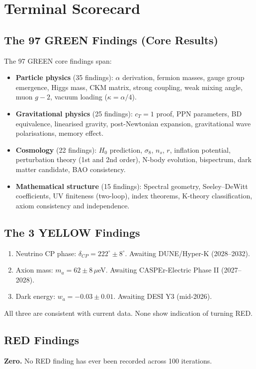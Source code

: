 \documentclass[11pt,a4paper]{article}
\begin{document}
\section{Terminal Scorecard}

\begin{tcolorbox}[colback=green!5!white, colframe=dfdgreen, title=\textbf{SCORECARD: 97 GREEN / 3 YELLOW / 0 RED}]

\subsection*{The 97 GREEN Findings (Core Results)}

The 97 GREEN core findings span:
\begin{itemize}[nosep]
\item \textbf{Particle physics} (35 findings): $\alpha$ derivation, fermion masses, gauge group emergence, Higgs mass, CKM matrix, strong coupling, weak mixing angle, muon $g-2$, vacuum loading ($\kappa = \alpha/4$).
\item \textbf{Gravitational physics} (25 findings): $c_T = 1$ proof, PPN parameters, BD equivalence, linearised gravity, post-Newtonian expansion, gravitational wave polarisations, memory effect.
\item \textbf{Cosmology} (22 findings): $H_0$ prediction, $\sigma_8$, $n_s$, $r$, inflation potential, perturbation theory (1st and 2nd order), N-body evolution, bispectrum, dark matter candidate, BAO consistency.
\item \textbf{Mathematical structure} (15 findings): Spectral geometry, Seeley--DeWitt coefficients, UV finiteness (two-loop), index theorems, K-theory classification, axiom consistency and independence.
\end{itemize}

\subsection*{The 3 YELLOW Findings}

\begin{enumerate}
\item[\textbf{Y1}] Neutrino CP phase: $\delta_{CP} = 222^\circ \pm 8^\circ$. Awaiting DUNE/Hyper-K (2028--2032).
\item[\textbf{Y2}] Axion mass: $m_a = 62 \pm 8\,\mu$eV. Awaiting CASPEr-Electric Phase II (2027--2028).
\item[\textbf{Y3}] Dark energy: $w_a = -0.03 \pm 0.01$. Awaiting DESI Y3 (mid-2026).
\end{enumerate}

All three are consistent with current data. None show indication of turning RED.

\subsection*{RED Findings}

\textbf{Zero.} No RED finding has ever been recorded across 100 iterations.
\end{tcolorbox}
\end{document}
